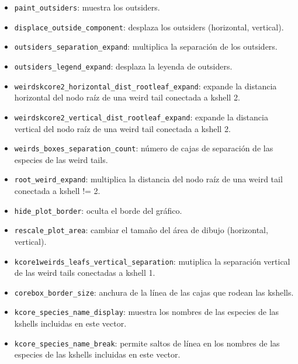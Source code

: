 \begin{itemize}
\item \texttt{paint\_outsiders}: muestra los outsiders.

\item \texttt{displace\_outside\_component}: desplaza los outsiders (horizontal, vertical).

\item \texttt{outsiders\_separation\_expand}: multiplica la separación de los outsiders.

\item \texttt{outsiders\_legend\_expand}: desplaza la leyenda de outsiders.

\item \texttt{weirdskcore2\_horizontal\_dist\_rootleaf\_expand}: expande la distancia horizontal del nodo raíz de una weird tail conectada a kshell 2.

\item \texttt{weirdskcore2\_vertical\_dist\_rootleaf\_expand}: expande la distancia vertical del nodo raíz de una weird tail conectada a kshell 2.

\item \texttt{weirds\_boxes\_separation\_count}: número de cajas de separación de las especies de las weird tails.

\item \texttt{root\_weird\_expand}: multiplica la distancia del nodo raíz de una weird tail conectada a kshell != 2.

\item \texttt{hide\_plot\_border}: oculta el borde del gráfico.

\item \texttt{rescale\_plot\_area}: cambiar el tamaño del área de dibujo (horizontal, vertical).

\item \texttt{kcore1weirds\_leafs\_vertical\_separation}: mutiplica la separación vertical de las weird tails conectadas a kshell 1.

\item \texttt{corebox\_border\_size}: anchura de la línea de las cajas que rodean las kshells.

\item \texttt{kcore\_species\_name\_display}: muestra los nombres de las especies de las kshells incluidas en este vector.

\item \texttt{kcore\_species\_name\_break}: permite saltos de línea en los nombres de las especies de las kshells incluidas en este vector.


\end{itemize}
